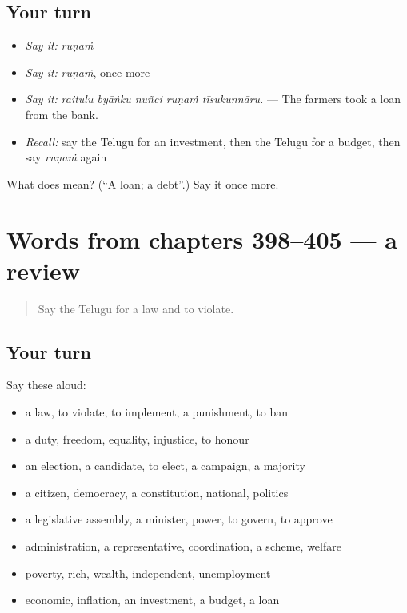 \subsection*{Your turn}
\begin{itemize}
\raggedright
  \item \emph{Say it:} \emph{ruṇaṁ}
  \item \emph{Say it:} \emph{ruṇaṁ}, once more
  \item \emph{Say it:} \emph{raitulu byāṅku nuñci ruṇaṁ tīsukunnāru.} — The farmers took a loan from the bank.
  \item \emph{Recall:} say the Telugu for an investment, then the Telugu for a budget, then say \emph{ruṇaṁ} again
\end{itemize}

\begin{tcolorbox}[breakable,colback=teal!4,colframe=teal!35!black,title={Before you move on}]
What does  mean? (\textquotedblleft{}A loan; a debt\textquotedblright{}.) Say it once more.
\end{tcolorbox}
\section[(dialogue)]{Words from chapters 398–405 — a review}

\label{lesson:TE-R405-review-398-405}



\begin{quote}
Say the Telugu for a law and to violate.
\end{quote}

\subsection*{Your turn}
Say these aloud:

\begin{itemize}
\raggedright
  \item a law, to violate, to implement, a punishment, to ban
  \item a duty, freedom, equality, injustice, to honour
  \item an election, a candidate, to elect, a campaign, a majority
  \item a citizen, democracy, a constitution, national, politics
  \item a legislative assembly, a minister, power, to govern, to approve
  \item administration, a representative, coordination, a scheme, welfare
  \item poverty, rich, wealth, independent, unemployment
  \item economic, inflation, an investment, a budget, a loan
\end{itemize}

